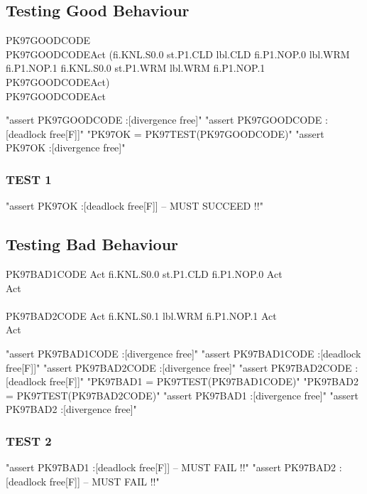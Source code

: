 \subsection{Testing Good Behaviour} %
\begin{circus}
\circprocess PK97GOODCODE \circdef \circbegin\\
PK97GOODCODEAct \circdef (fi.KNL.S0.0
  \then st.P1.CLD \then lbl.CLD \then fi.P1.NOP.0 \then lbl.WRM \then fi.P1.NOP.1
  \then fi.KNL.S0.0
  \then st.P1.WRM \then lbl.WRM \then fi.P1.NOP.1
  \then PK97GOODCODEAct)\\
 \circspot PK97GOODCODEAct\\
   \circend
\end{circus}
\begin{assert}
"assert PK97GOODCODE :[divergence free]"
\also "assert PK97GOODCODE :[deadlock free[F]]"
\also "PK97OK = PK97TEST(PK97GOODCODE)"
\also "assert PK97OK :[divergence free]"
\end{assert}
\subsubsection{TEST 1}
\begin{assert}
"assert PK97OK :[deadlock free[F]]  -- MUST SUCCEED !!"
\end{assert}

\subsection{Testing Bad Behaviour} %
\begin{circus}
\circprocess PK97BAD1CODE \circdef \circbegin
  Act \circdef fi.KNL.S0.0 \then st.P1.CLD \then fi.P1.NOP.0 \then Act\\
  \circspot Act\\
 \circend\\
\circprocess PK97BAD2CODE \circdef\circbegin
  Act \circdef fi.KNL.S0.1 \then lbl.WRM \then fi.P1.NOP.1 \then Act\\
  \circspot Act\\
 \circend
 \end{circus}
\begin{assert}
"assert PK97BAD1CODE :[divergence free]"
\also "assert PK97BAD1CODE :[deadlock free[F]]"
\also "assert PK97BAD2CODE :[divergence free]"
\also "assert PK97BAD2CODE :[deadlock free[F]]"
\also "PK97BAD1 = PK97TEST(PK97BAD1CODE)"
\also "PK97BAD2 = PK97TEST(PK97BAD2CODE)"
\also "assert PK97BAD1 :[divergence free]"
\also "assert PK97BAD2 :[divergence free]"
\end{assert}
\subsubsection{TEST 2}
\begin{assert}
"assert PK97BAD1 :[deadlock free[F]]  -- MUST FAIL !!"
\also "assert PK97BAD2 :[deadlock free[F]]  -- MUST FAIL !!"
\end{assert}
